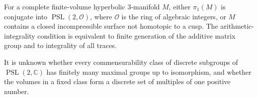 \begin{theorem}
\label{thurston-ch06-bass-arithmetic-alternative}

For a complete finite-volume hyperbolic $3$-manifold $M$, either $\pi_1(M)$ is conjugate into $\operatorname{PSL}(2,\mathcal O)$, where $\mathcal O$ is the ring of algebraic integers, or $M$ contains a closed incompressible surface not homotopic to a cusp. The arithmetic-integrality condition is equivalent to finite generation of the additive matrix group and to integrality of all traces.
\end{theorem}

\begin{conjecture}
\label{thurston-ch06-commensurability-questions}

It is unknown whether every commensurability class of discrete subgroups of $\operatorname{PSL}(2,\mathbb C)$ has finitely many maximal groups up to isomorphism, and whether the volumes in a fixed class form a discrete set of multiples of one positive number.
\end{conjecture}
